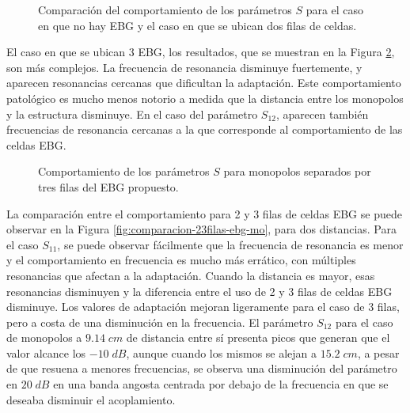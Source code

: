 \begin{figure}[H]
	\centering 
	\hspace{0pt}
	\caption{Comparación del comportamiento de los parámetros $S$ para el caso en que no hay EBG y el caso en que se ubican dos filas de celdas.}
	\label{fig:comparacion-2filas-ebg-mo}
\end{figure} 

El caso en que se ubican 3 EBG, los resultados, que se muestran en la Figura \ref{fig:comparacion-3filas-ebg-mo}, son más complejos. La frecuencia de resonancia disminuye fuertemente, y aparecen resonancias cercanas que dificultan la adaptación. Este comportamiento patológico es mucho menos notorio a medida que la distancia entre los monopolos y la estructura disminuye. En el caso del parámetro $S_{12}$, aparecen también frecuencias de resonancia cercanas a la que corresponde al comportamiento de las celdas EBG.

\begin{figure}[H]
	\centering 
	\hspace{0pt}
	\caption{Comportamiento de los parámetros $S$ para monopolos separados por tres filas del EBG propuesto.}
	\label{fig:comparacion-3filas-ebg-mo}
\end{figure}

La comparación entre el comportamiento para 2 y 3 filas de celdas EBG se puede observar en la Figura \ref{fig:comparacion-23filas-ebg-mo}, para dos distancias. Para el caso $S_{11}$, se puede observar fácilmente que la frecuencia de resonancia es menor y el comportamiento en frecuencia es mucho más errático, con múltiples resonancias que afectan a la adaptación. Cuando la distancia es mayor, esas resonancias disminuyen y la diferencia entre el uso de 2 y 3 filas de celdas EBG disminuye. Los valores de adaptación mejoran ligeramente para el caso de 3 filas, pero a costa de una disminución en la frecuencia. El parámetro $S_{12}$ para el caso de monopolos a $9.14\; cm$ de distancia entre sí presenta picos que generan que el valor alcance los $-10\;dB$, aunque cuando los mismos se alejan a $15.2\;cm$, a pesar de que resuena a menores frecuencias, se observa una disminución del parámetro en $20\; dB$ en una banda angosta centrada por debajo de la frecuencia en que se deseaba disminuir el acoplamiento.

